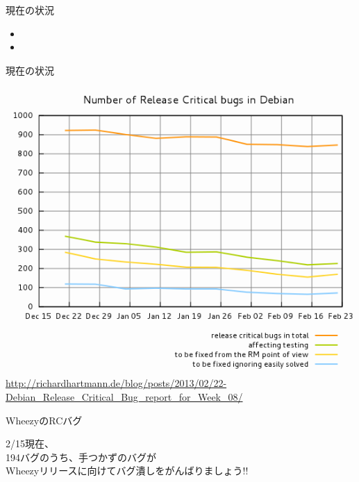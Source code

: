 \begin{frame}{現在の状況}
\huge{
\begin{itemize}
  \item {}
  \item \color{red}{リリースに向けたバグ（RCバグ）潰しが進行中}
\end{itemize}
}
\end{frame}

\begin{frame}{現在の状況}

\begin{center}
\includegraphics[height=0.7\textheight]{image201302/osc-tokyo/rc_bugs_report_en_2013-08.png}\\
\url{http://richardhartmann.de/blog/posts/2013/02/22-Debian_Release_Critical_Bug_report_for_Week_08/}
\end{center}

\end{frame}

\begin{frame}{WheezyのRCバグ}

\begin{center}
\LARGE
2/15現在、\\
194バグのうち、手つかずのバグが\color{red}{残り66バグ}\color{black}{のみです。}\\
Wheezyリリースに向けてバグ潰しをがんばりましょう!!
\end{center}

\end{frame}

